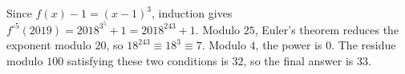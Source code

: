 Since $f(x)-1=(x-1)^3$, induction gives $f^{\circ5}(2019)=2018^{3^5}+1=2018^{243}+1$. Modulo $25$, Euler's theorem reduces the exponent modulo $20$, so $18^{243}\equiv18^3\equiv7$. Modulo $4$, the power is $0$. The residue modulo $100$ satisfying these two conditions is $32$, so the final answer is $\boxed{33}$.
